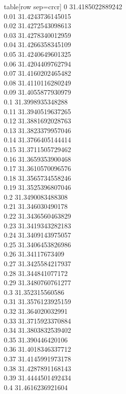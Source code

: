   table[row sep=crcr]{%
0	31.4185022889242\\
0.01	31.4243736145015\\
0.02	31.4272543098613\\
0.03	31.4278340012959\\
0.04	31.4266358345109\\
0.05	31.4240649601325\\
0.06	31.4204409762794\\
0.07	31.4160202465482\\
0.08	31.4110116280249\\
0.09	31.4055877930979\\
0.1	31.3998935348288\\
0.11	31.3940519637265\\
0.12	31.3881692028763\\
0.13	31.3823379957046\\
0.14	31.3766405144414\\
0.15	31.3711505729462\\
0.16	31.3659353900468\\
0.17	31.3610570096576\\
0.18	31.3565734558246\\
0.19	31.3525396807046\\
0.2	31.3490083488308\\
0.21	31.346030490178\\
0.22	31.3436560463829\\
0.23	31.3419343282183\\
0.24	31.3409143975057\\
0.25	31.3406453826986\\
0.26	31.34117673409\\
0.27	31.3425584217937\\
0.28	31.344841077172\\
0.29	31.3480760761277\\
0.3	31.352315560586\\
0.31	31.3576123925159\\
0.32	31.364020032991\\
0.33	31.3715923370884\\
0.34	31.3803832539402\\
0.35	31.390446420106\\
0.36	31.4018346337712\\
0.37	31.4145991973178\\
0.38	31.4287891168143\\
0.39	31.4444501492434\\
0.4	31.4616236921604\\
}
